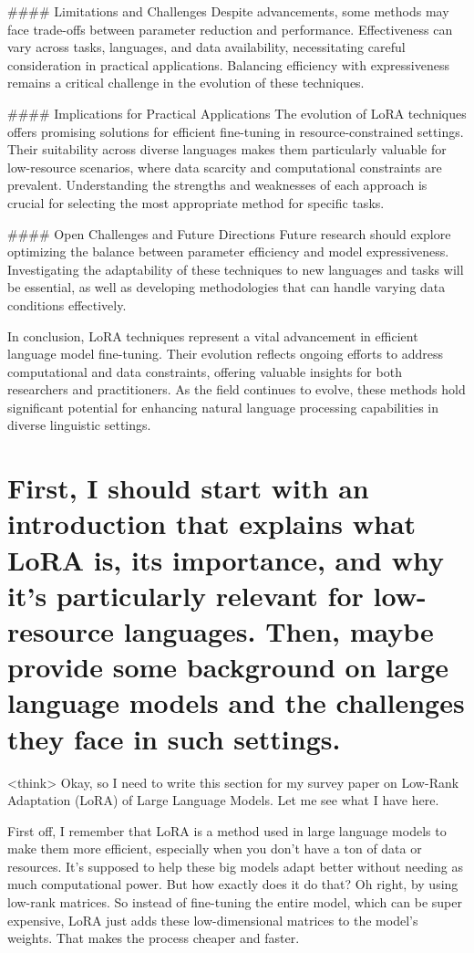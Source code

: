\documentclass[conference]{IEEEtran}
\begin{document}
#### Limitations and Challenges
Despite advancements, some methods may face trade-offs between parameter reduction and performance. Effectiveness can vary across tasks, languages, and data availability, necessitating careful consideration in practical applications. Balancing efficiency with expressiveness remains a critical challenge in the evolution of these techniques.

#### Implications for Practical Applications
The evolution of LoRA techniques offers promising solutions for efficient fine-tuning in resource-constrained settings. Their suitability across diverse languages makes them particularly valuable for low-resource scenarios, where data scarcity and computational constraints are prevalent. Understanding the strengths and weaknesses of each approach is crucial for selecting the most appropriate method for specific tasks.

#### Open Challenges and Future Directions
Future research should explore optimizing the balance between parameter efficiency and model expressiveness. Investigating the adaptability of these techniques to new languages and tasks will be essential, as well as developing methodologies that can handle varying data conditions effectively.

In conclusion, LoRA techniques represent a vital advancement in efficient language model fine-tuning. Their evolution reflects ongoing efforts to address computational and data constraints, offering valuable insights for both researchers and practitioners. As the field continues to evolve, these methods hold significant potential for enhancing natural language processing capabilities in diverse linguistic settings.

\section{First, I should start with an introduction that explains what LoRA is, its importance, and why it's particularly relevant for low-resource languages. Then, maybe provide some background on large language models and the challenges they face in such settings.}
<think>
Okay, so I need to write this section for my survey paper on Low-Rank Adaptation (LoRA) of Large Language Models. Let me see what I have here.

First off, I remember that LoRA is a method used in large language models to make them more efficient, especially when you don't have a ton of data or resources. It's supposed to help these big models adapt better without needing as much computational power. But how exactly does it do that? Oh right, by using low-rank matrices. So instead of fine-tuning the entire model, which can be super expensive, LoRA just adds these low-dimensional matrices to the model's weights. That makes the process cheaper and faster.
\end{document}
